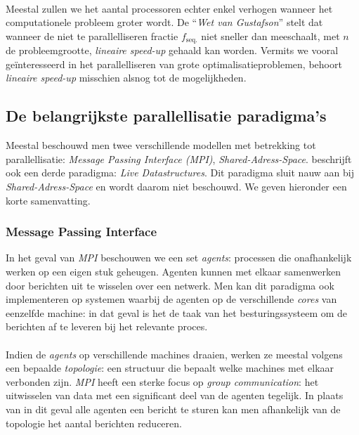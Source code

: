 \paragraph{}
Meestal zullen we het aantal processoren echter enkel verhogen wanneer het computationele probleem groter wordt. De ``\emph{Wet van Gustafson}''\cite{Gustafson:1988:RAL:42411.42415} stelt dat wanneer de niet te parallelliseren fractie $f_{\mbox{seq.}}$ niet sneller dan  meeschaalt, met $n$ de probleemgrootte, \emph{lineaire speed-up} gehaald kan worden. Vermits we vooral ge\"interesseerd in het parallelliseren van grote optimalisatieproblemen, behoort \emph{lineaire speed-up} misschien alsnog tot de mogelijkheden.

\subsection{De belangrijkste parallellisatie paradigma's}

Meestal beschouwd men twee verschillende modellen met betrekking tot parallellisatie: \emph{Message Passing Interface (MPI)}, \emph{Shared-Adress-Space}. \cite{books/daglib/0066939} beschrijft ook een derde paradigma: \emph{Live Datastructures}. Dit paradigma sluit nauw aan bij \emph{Shared-Adress-Space} en wordt daarom niet beschouwd. We geven hieronder een korte samenvatting.\cite{books/bc/KumarGGK94,books/daglib/0066939}

\subsubsection{Message Passing Interface}

In het geval van \emph{MPI} beschouwen we een set \emph{agents}: processen die onafhankelijk werken op een eigen stuk geheugen. Agenten kunnen met elkaar samenwerken door berichten uit te wisselen over een netwerk. Men kan dit paradigma ook implementeren op systemen waarbij de agenten op de verschillende \emph{cores} van eenzelfde machine: in dat geval is het de taak van het besturingssysteem om de berichten af te leveren bij het relevante proces.\cite{books/bc/KumarGGK94,books/daglib/0066939,books/daglib/0015079,mpi10}

\paragraph{}
Indien de \emph{agents} op verschillende machines draaien, werken ze meestal volgens een bepaalde \emph{topologie}: een structuur die bepaalt welke machines met elkaar verbonden zijn. \emph{MPI} heeft een sterke focus op \emph{group communication}: het uitwisselen van data met een significant deel van de agenten tegelijk. In plaats van in dit geval alle agenten een bericht te sturen kan men afhankelijk van de topologie het aantal berichten reduceren.\cite{books/bc/KumarGGK94}

